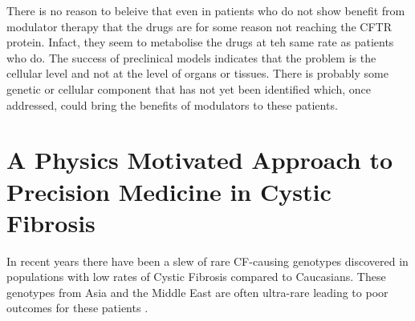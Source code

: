 There is no reason to beleive that even in patients who do not show benefit from modulator therapy that the drugs are for some reason not reaching the CFTR protein. Infact, they seem to metabolise the drugs at teh same rate as patients who do. The success of preclinical models indicates that the problem is the cellular level and not at the level of organs or tissues. There is probably some genetic or cellular component that has not yet been identified which, once addressed, could bring the benefits of modulators to these patients.

\section{A Physics Motivated Approach to Precision Medicine in Cystic Fibrosis}


In recent years there have been a slew of rare CF-causing genotypes discovered in populations with low rates of Cystic Fibrosis compared to Caucasians. These genotypes from Asia and the Middle East are often ultra-rare leading to poor outcomes for these patients \cite{}. 



